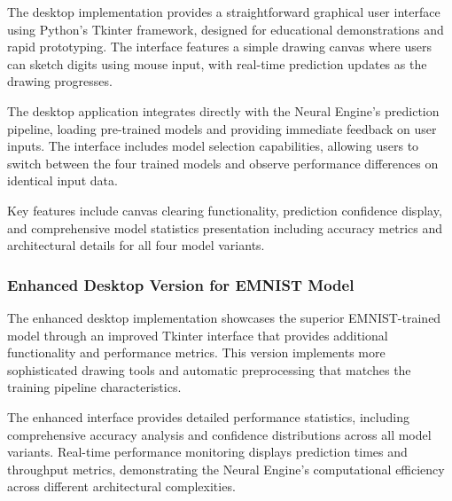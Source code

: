 \documentclass[11pt,a4paper]{report}
\begin{document}
The desktop implementation provides a straightforward graphical user interface using Python's Tkinter framework, designed for educational demonstrations and rapid prototyping. The interface features a simple drawing canvas where users can sketch digits using mouse input, with real-time prediction updates as the drawing progresses.

The desktop application integrates directly with the Neural Engine's prediction pipeline, loading pre-trained models and providing immediate feedback on user inputs. The interface includes model selection capabilities, allowing users to switch between the four trained models and observe performance differences on identical input data.

Key features include canvas clearing functionality, prediction confidence display, and comprehensive model statistics presentation including accuracy metrics and architectural details for all four model variants.

\subsubsection{Enhanced Desktop Version for EMNIST Model}

The enhanced desktop implementation showcases the superior EMNIST-trained model through an improved Tkinter interface that provides additional functionality and performance metrics. This version implements more sophisticated drawing tools and automatic preprocessing that matches the training pipeline characteristics.

The enhanced interface provides detailed performance statistics, including comprehensive accuracy analysis and confidence distributions across all model variants. Real-time performance monitoring displays prediction times and throughput metrics, demonstrating the Neural Engine's computational efficiency across different architectural complexities.
\end{document}
